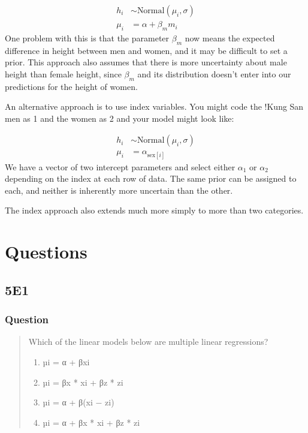 \documentclass[
]{book}
\begin{document}
\[
\begin{aligned}
h_i &∼ \text{Normal}(\mu_i, \sigma) \\
\mu_i &= \alpha + \beta_m m_i
\end{aligned}
\]
One problem with this is that the parameter \(\beta_m\) now means the expected difference in height between men and women, and it may be difficult to set a prior. This approach also assumes that there is more uncertainty about male height than female height, since \(\beta_m\) and its distribution doesn't enter into our predictions for the height of women.

An alternative approach is to use index variables. You might code the !Kung San men as 1 and the women as 2 and your model might look like:

\[
\begin{aligned}
h_i &∼ \text{Normal}(\mu_i, \sigma) \\
\mu_i &= \alpha_{\text{sex}[i]} 
\end{aligned}
\]
We have a vector of two intercept parameters and select either \(\alpha_1\) or \(\alpha_2\) depending on the index at each row of data. The same prior can be assigned to each, and neither is inherently more uncertain than the other.

The index approach also extends much more simply to more than two categories.

\hypertarget{questions-4}{%
\section{Questions}\label{questions-4}}

\hypertarget{e1-3}{%
\subsection*{5E1}\label{e1-3}}

\hypertarget{question-45}{%
\subsubsection*{Question}\label{question-45}}

\begin{quote}
Which of the linear models below are multiple linear regressions?

\begin{enumerate}
\def\labelenumi{(\arabic{enumi})}
\item
  µi = α + βxi
\item
  µi = βx * xi + βz * zi
\item
  µi = α + β(xi − zi)
\item
  µi = α + βx * xi + βz * zi
\end{enumerate}
\end{quote}
\end{document}
